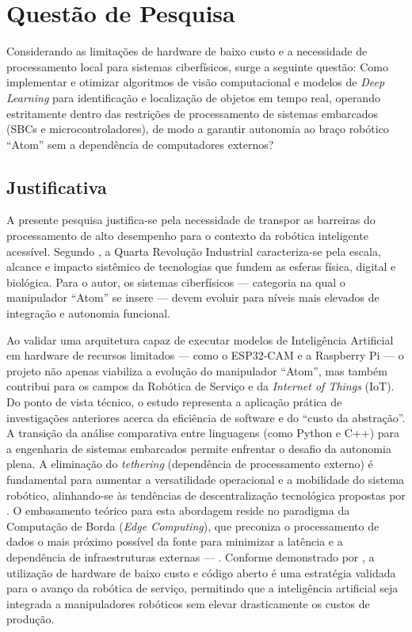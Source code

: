 \section*{Questão de Pesquisa}

Considerando as limitações de hardware de baixo custo e a necessidade de processamento local para sistemas ciberfísicos, surge a seguinte questão: Como implementar e otimizar algoritmos de visão computacional e modelos de \textit{Deep Learning} para identificação e localização de objetos em tempo real, operando estritamente dentro das restrições de processamento de sistemas embarcados (SBCs e microcontroladores), de modo a garantir autonomia ao braço robótico ``Atom'' sem a dependência de computadores externos?

\subsection*{Justificativa}

A presente pesquisa justifica-se pela necessidade de transpor as barreiras do processamento de alto desempenho para o contexto da robótica inteligente acessível. Segundo , a Quarta Revolução Industrial caracteriza-se pela escala, alcance e impacto sistêmico de tecnologias que fundem as esferas física, digital e biológica. Para o autor, os sistemas ciberfísicos — categoria na qual o manipulador ``Atom'' se insere — devem evoluir para níveis mais elevados de integração e autonomia funcional.



Ao validar uma arquitetura capaz de executar modelos de Inteligência Artificial em hardware de recursos limitados — como o ESP32-CAM e a Raspberry Pi — o projeto não apenas viabiliza a evolução do manipulador ``Atom'', mas também contribui para os campos da Robótica de Serviço e da \textit{Internet of Things} (IoT). Do ponto de vista técnico, o estudo representa a aplicação prática de investigações anteriores acerca da eficiência de software e do ``custo da abstração''. A transição da análise comparativa entre linguagens (como Python e C++) para a engenharia de sistemas embarcados permite enfrentar o desafio da autonomia plena. A eliminação do \textit{tethering} (dependência de processamento externo) é fundamental para aumentar a versatilidade operacional e a mobilidade do sistema robótico, alinhando-se às tendências de descentralização tecnológica propostas por .
O embasamento teórico para esta abordagem reside no paradigma da Computação de Borda (\textit{Edge Computing}), que preconiza o processamento de dados o mais próximo possível da fonte para minimizar a latência e a dependência de infraestruturas externas — . Conforme demonstrado por , a utilização de hardware de baixo custo e código aberto é uma estratégia validada para o avanço da robótica de serviço, permitindo que a inteligência artificial seja integrada a manipuladores robóticos sem elevar drasticamente os custos de produção.